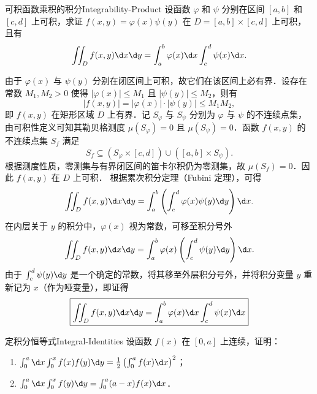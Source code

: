 \begin{problem}{可积函数乘积的积分}{Integrability-Product}
    设函数 $\varphi$ 和 $\psi$ 分别在区间 $[a, b]$ 和 $[c, d]$ 上可积，求证 $f(x, y) = \varphi(x) \psi(y)$ 在 $D = [a, b] \times [c, d]$ 上可积，且有
    \begin{equation}
        \iint_{D} f(x, y) \d x \d y = \int_{a}^{b} \varphi(x) \d x \int_{c}^{d} \psi(x) \d x.
    \end{equation}
\end{problem}

\begin{myproof}

    由于 $\varphi(x)$ 与 $\psi(y)$ 分别在闭区间上可积，故它们在该区间上必有界．设存在常数 $M_1, M_2 > 0$ 使得 $|\varphi(x)| \le M_1$ 且 $|\psi(y)| \le M_2$，则有
    \begin{equation}
        |f(x, y)| = |\varphi(x)| \cdot |\psi(y)| \le M_1 M_2,
    \end{equation}
    即 $f(x, y)$ 在矩形区域 $D$ 上有界．记 $S_\varphi$ 与 $S_\psi$ 分别为 $\varphi$ 与 $\psi$ 的不连续点集，由可积性定义可知其勒贝格测度 $\mu(S_\varphi) = 0$ 且 $\mu(S_\psi) = 0$．函数 $f(x, y)$ 的不连续点集 $S_f$ 满足
    \begin{equation}
        S_f \subseteq (S_\varphi \times [c, d]) \cup ([a, b] \times S_\psi).
    \end{equation}
    根据测度性质，零测集与有界闭区间的笛卡尔积仍为零测集，故 $\mu(S_f) = 0$．因此 $f(x, y)$ 在 $D$ 上可积．
    根据累次积分定理（Fubini 定理），可得
    \begin{equation}\label{eq:fubini-calc}
        \iint_{D} f(x, y) \d x \d y = \int_{a}^{b} \left( \int_{c}^{d} \varphi(x) \psi(y) \d y \right) \d x.
    \end{equation}
    在内层关于 $y$ 的积分中，$\varphi(x)$ 视为常数，可移至积分号外
    \begin{equation}
        \iint_{D} f(x, y) \d x \d y = \int_{a}^{b} \varphi(x) \left( \int_{c}^{d} \psi(y) \d y \right) \d x.
    \end{equation}
    由于 $\int_{c}^{d} \psi(y) \d y$ 是一个确定的常数，将其移至外层积分号外，并将积分变量 $y$ 重新记为 $x$（作为哑变量），即证得
    \begin{equation}
        \boxed{\iint_{D} f(x, y) \d x \d y = \int_{a}^{b} \varphi(x) \d x \int_{c}^{d} \psi(x) \d x}
    \end{equation}
\end{myproof}


\begin{problem}{定积分恒等式}{Integral-Identities}
    设函数 $f(x)$ 在 $[0, a]$ 上连续，证明：
    \begin{enumerate}
        \item $\int_0^a \d x \int_0^x f(x)f(y) \d y = \frac{1}{2} \left( \int_0^a f(x) \d x \right)^2$；
        \item $\int_0^a \d x \int_0^x f(y) \d y = \int_0^a (a-x)f(x) \d x$．
    \end{enumerate}
\end{problem}

